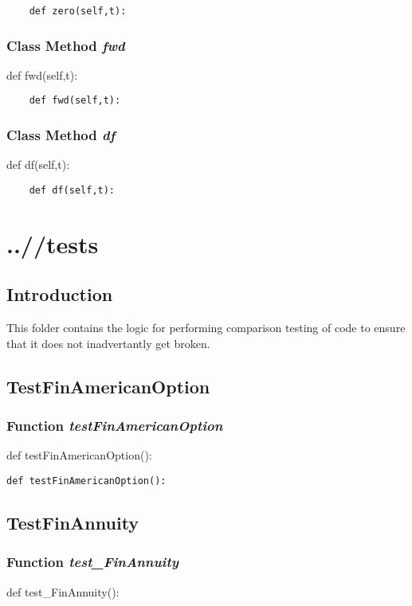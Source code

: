 \documentclass[twoside,11pt]{book}
\begin{document}
\begin{lstlisting}
    def zero(self,t):
\end{lstlisting}

\subsection{Class Method {\it fwd}}
def fwd(self,t):

\begin{lstlisting}
    def fwd(self,t):
\end{lstlisting}

\subsection{Class Method {\it df}}
def df(self,t):

\begin{lstlisting}
    def df(self,t):
\end{lstlisting}


\chapter{..//tests}
\section{Introduction}
This folder contains the logic for performing comparison testing of code to ensure that it does not inadvertantly get broken. 

\newpage
\section{TestFinAmericanOption}

\subsection{Function {\it testFinAmericanOption}}
def testFinAmericanOption():

\begin{lstlisting}
def testFinAmericanOption():
\end{lstlisting}


\newpage
\section{TestFinAnnuity}

\subsection{Function {\it test\_FinAnnuity}}
def test\_FinAnnuity():
\end{document}
